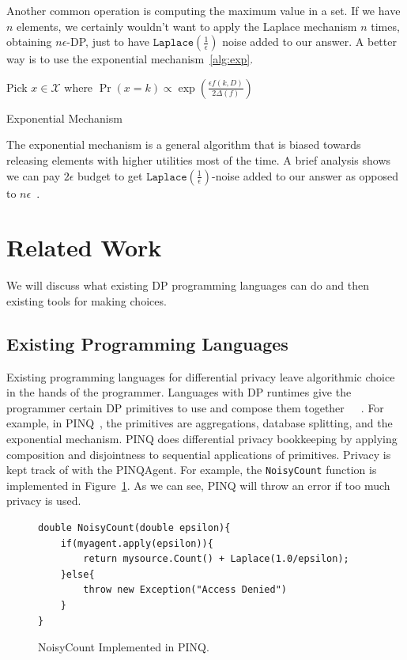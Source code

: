 \documentclass[11pt]{report}
\renewcommand{\t}[1]{\texttt{#1}}
\begin{document}
Another common operation is computing the maximum value in a set. If we have $n$ elements, we certainly wouldn't want to apply the Laplace mechanism $n$ times, obtaining $n\epsilon$-DP, just to have $\t{Laplace}\left(\frac{1}{\epsilon}\right)$ noise added to our answer. A better way is to use the exponential mechanism~\ref{alg:exp}.
\begin{algorithm}\label{alg:exp}
\SetAlgoLined
{}
Pick $x \in \mathcal{X}$ where $\Pr(x=k) \propto \exp\left(\frac{\epsilon f(k, D)}{2\Delta(f)}\right)$\;
\caption{Exponential Mechanism}
\end{algorithm}
The exponential mechanism is a general algorithm that is biased towards releasing elements with higher utilities most of the time. A brief analysis shows we can pay $2\epsilon$ budget to get $\t{Laplace}\left(\frac{1}{\epsilon}\right)$-noise added to our answer as opposed to $n\epsilon$~\cite{Dwork:2006}.
\section{Related Work}
We will discuss what existing DP programming languages can do and then existing tools for making choices.
\subsection{Existing Programming Languages}
Existing programming languages for differential privacy leave algorithmic choice in the hands of the programmer. Languages with DP runtimes give the programmer certain DP primitives to use and compose them together~\cite{McSherry:2010}~\cite{Proserpio:2014}~\cite{Johnson:2017}. For example, in PINQ~\cite{McSherry:2010}, the primitives are aggregations, database splitting, and the exponential mechanism. PINQ does differential privacy bookkeeping by applying composition and disjointness to sequential applications of primitives. Privacy is kept track of with the PINQAgent. For example, the \t{NoisyCount} function is implemented in Figure~\ref{fig:PINQNoisyCount}. As we can see, PINQ will throw an error if too much privacy is used.

\begin{figure}
\begin{lstlisting}[style=myCStyle]
double NoisyCount(double epsilon){
    if(myagent.apply(epsilon)){
        return mysource.Count() + Laplace(1.0/epsilon);
    }else{
        throw new Exception("Access Denied")
    }
}
\end{lstlisting}
\caption{NoisyCount Implemented in PINQ.}
\label{fig:PINQNoisyCount}
\end{figure}
\end{document}
